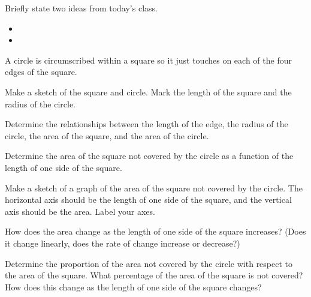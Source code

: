 \postClass

\begin{problem}
\item Briefly state two ideas from today's class.
  \begin{itemize}
  \item
  \item
  \end{itemize}
\item A circle is circumscribed within a square so it just touches on
  each of the four edges of the square.
  \begin{subproblem}
    \item Make a sketch of the square and circle. Mark the length of
      the square and the radius of the circle.
    \item Determine the relationships between the length of the edge,
      the radius of the circle, the area of the square, and the area
      of the circle.
    \item Determine the area of the square not covered by the circle
      as a function of the length of one side of the square.
    \item Make a sketch of a graph of the area of the square not
      covered by the circle. The horizontal axis should be the length
      of one side of the square, and the vertical axis should be the
      area. Label your axes.
    \item How does the area change as the length of one side of the
      square increases? (Does it change linearly, does the rate of
      change increase or decrease?)
    \item Determine the proportion of the area not covered by the
      circle with respect to the area of the square. What percentage
      of the area of the square is not covered? How does this change
      as the length of one side of the square changes?
  \end{subproblem}

\end{problem}



